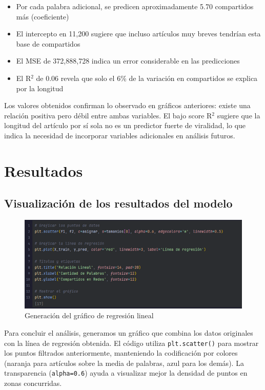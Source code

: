 \documentclass[12pt, a4paper]{article}
\begin{document}
\begin{itemize}
    \item Por cada palabra adicional, se predicen aproximadamente 5.70 compartidos más (coeficiente)
    \item El intercepto en 11,200 sugiere que incluso artículos muy breves tendrían esta base de compartidos
    \item El MSE de 372,888,728 indica un error considerable en las predicciones
    \item El R$^2$ de 0.06 revela que solo el 6\% de la variación en compartidos se explica por la longitud
\end{itemize}

Los valores obtenidos confirman lo observado en gráficos anteriores: existe una relación positiva pero débil entre ambas variables. El bajo score R$^2$ sugiere que la longitud del artículo por sí sola no es un predictor fuerte de viralidad, lo que indica la necesidad de incorporar variables adicionales en análisis futuros.

\section{Resultados}

\subsection{Visualización de los resultados del modelo}

\begin{figure}[H]
    \centering
    \includegraphics[width=1.0\textwidth]{Actividad-9/Imagen11.png}
    \caption{Generación del gráfico de regresión lineal}
\end{figure}

Para concluir el análisis, generamos un gráfico que combina los datos originales con la línea de regresión obtenida. El código utiliza \texttt{plt.scatter()} para mostrar los puntos filtrados anteriormente, manteniendo la codificación por colores (naranja para artículos sobre la media de palabras, azul para los demás). La transparencia (\texttt{alpha=0.6}) ayuda a visualizar mejor la densidad de puntos en zonas concurridas.
\end{document}
